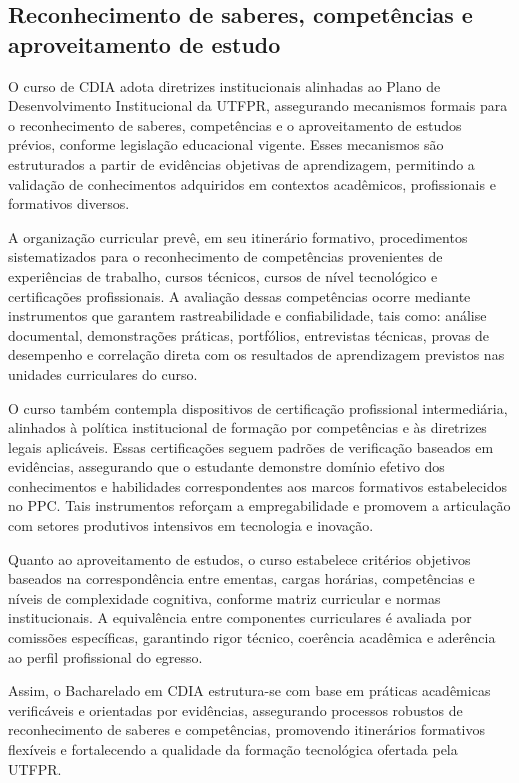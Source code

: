 \subsection{Reconhecimento de saberes, competências e aproveitamento de estudo}

O curso de CDIA adota diretrizes institucionais alinhadas ao Plano de Desenvolvimento Institucional da UTFPR, assegurando mecanismos formais para o reconhecimento de saberes, competências e o aproveitamento de estudos prévios, conforme legislação educacional vigente. Esses mecanismos são estruturados a partir de evidências objetivas de aprendizagem, permitindo a validação de conhecimentos adquiridos em contextos acadêmicos, profissionais e formativos diversos.

A organização curricular prevê, em seu itinerário formativo, procedimentos sistematizados para o reconhecimento de competências provenientes de experiências de trabalho, cursos técnicos, cursos de nível tecnológico e certificações profissionais. A avaliação dessas competências ocorre mediante instrumentos que garantem rastreabilidade e confiabilidade, tais como: análise documental, demonstrações práticas, portfólios, entrevistas técnicas, provas de desempenho e correlação direta com os resultados de aprendizagem previstos nas unidades curriculares do curso.

O curso também contempla dispositivos de certificação profissional intermediária, alinhados à política institucional de formação por competências e às diretrizes legais aplicáveis. Essas certificações seguem padrões de verificação baseados em evidências, assegurando que o estudante demonstre domínio efetivo dos conhecimentos e habilidades correspondentes aos marcos formativos estabelecidos no PPC. Tais instrumentos reforçam a empregabilidade e promovem a articulação com setores produtivos intensivos em tecnologia e inovação.

Quanto ao aproveitamento de estudos, o curso estabelece critérios objetivos baseados na correspondência entre ementas, cargas horárias, competências e níveis de complexidade cognitiva, conforme matriz curricular e normas institucionais. A equivalência entre componentes curriculares é avaliada por comissões específicas, garantindo rigor técnico, coerência acadêmica e aderência ao perfil profissional do egresso.

Assim, o Bacharelado em CDIA estrutura-se com base em práticas acadêmicas verificáveis e orientadas por evidências, assegurando processos robustos de reconhecimento de saberes e competências, promovendo itinerários formativos flexíveis e fortalecendo a qualidade da formação tecnológica ofertada pela UTFPR.

